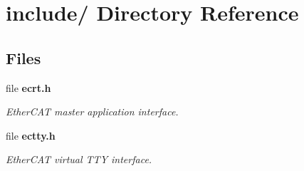 \section{include/ Directory Reference}
\label{dir_d44c64559bbebec7f509842c48db8b23}
\subsection*{Files}
\begin{DoxyCompactItemize}
\item 
file {\bf ecrt.\-h}
\begin{DoxyCompactList}\small\item\em Ether\-C\-A\-T master application interface. \end{DoxyCompactList}\item 
file {\bf ectty.\-h}
\begin{DoxyCompactList}\small\item\em Ether\-C\-A\-T virtual T\-T\-Y interface. \end{DoxyCompactList}\end{DoxyCompactItemize}
